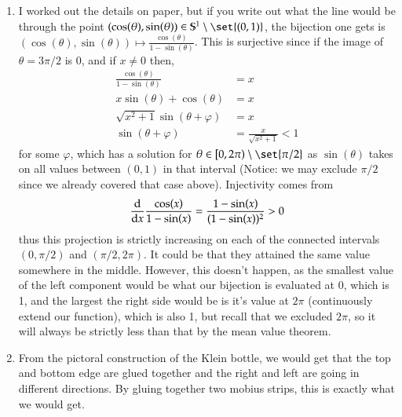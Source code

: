 \documentclass[12pt]{article}
\theoremstyle{definitionstyle}
\def\mbb#1{\mathbb{#1}}
\def \cph{\varphi}
\renewcommand{\S}{\mbb{S}}
\begin{document}
\begin{enumerate}[leftmargin=\labelsep]
		\item I worked out the details on paper, but if you write out what the line would be through the point $(\cos(\theta), \sin(\theta)) \in \S^1 \setminus \set{(0,1)}$, the bijection one gets is $(\cos(\theta), \sin(\theta)) \mapsto \frac{\cos(\theta)}{1-\sin(\theta)}$. This is surjective since if the image of $\theta = 3\pi/2$ is 0, and if $x \neq 0$ then,
		\begin{align*}
			\frac{\cos(\theta)}{1-\sin(\theta)} &= x \\
			x\sin(\theta)+\cos(\theta)&=x \\
			\sqrt{x^2+1}\sin(\theta+\cph) &= x \\
			\sin(\theta+\cph) &= \frac{x}{\sqrt{x^2+1}} < 1
		\end{align*}
		for some $\cph$, which has a solution for $\theta \in [0, 2\pi) \setminus \set{\pi/2}$ as $\sin(\theta)$ takes on all values between $(0,1)$ in that interval (Notice: we may exclude $\pi/2$ since we already covered that case above). Injectivity comes from 
		\begin{align*}
			\dv{x} \frac{\cos(x)}{1-\sin(x)} = \frac{1-\sin(x)}{(1-\sin(x))^2} > 0
		\end{align*}
		thus this projection is strictly increasing on each of the connected intervals $(0, \pi/2)$ and $(\pi/2, 2\pi)$. It could be that they attained the same value somewhere in the middle. However, this doesn't happen, as the smallest value of the left component would be what our bijection is evaluated at 0, which is 1, and the largest the right side would be is it's value at $2\pi$ (continuously extend our function), which is also 1, but recall that we excluded $2\pi$, so it will always be strictly less than that by the mean value theorem.
		
		\item From the pictoral construction of the Klein bottle, we would get that the top and bottom edge are glued together and the right and left are going in different directions. By gluing together two mobius strips, this is exactly what we would get.
	\end{enumerate}
\end{document}
